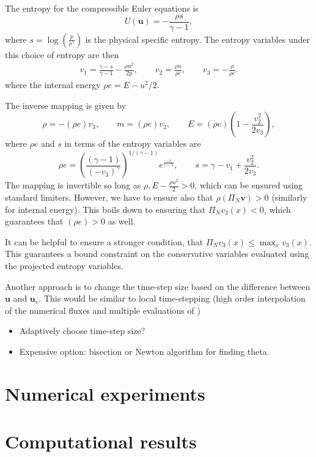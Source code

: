 \documentclass[preprint,10pt]{article}
\theoremstyle{definition}
\theoremstyle{lemma}
\theoremstyle{theorem}
\theoremstyle{assumption}
\newcommand{\LRp}[1]{\left( #1 \right)}
\begin{document}
{The entropy for the compressible Euler equations is 
\[
U(\bm{u}) = -\frac{\rho s}{\gamma-1},
\]
where $s = \log\LRp{\frac{p}{\rho^\gamma}}$ is the physical specific entropy.  The entropy variables under this choice of entropy are then
\begin{align*}
v_1 = \frac{\gamma-s}{\gamma-1} - \frac{\rho u^2}{2p}, \qquad v_2 = \frac{\rho u}{\rho e}, \qquad v_3 = -\frac{\rho}{\rho e}.
\end{align*}
where the internal energy $\rho e = E - u^2/2$.

The inverse mapping is given by 
\[
\rho = -(\rho e) v_3, \qquad m = (\rho e) v_2, \qquad E = (\rho e)\LRp{1 - \frac{v_2^2}{2 v_3}},
\]
where $\rho e$ and $s$ in terms of the entropy variables are 
\[
\rho e = \LRp{\frac{(\gamma-1)}{\LRp{-v_3}^{\gamma}}}^{1/(\gamma-1)}e^{\frac{-s}{\gamma-1}}, \qquad s = \gamma - v_1 + \frac{v_2^2}{2v_3}.
\]
The mapping is invertible so long as $\rho, E-\frac{\rho u^2}{2} > 0$, which can be ensured using standard limiters.  However, we have to ensure also that $\rho(\Pi_N\bm{v}) > 0$ (similarly for internal energy).  This boils down to ensuring that $\Pi_N v_3(x) < 0$, which guarantees that $(\rho e) > 0$ as well.   

It can be helpful to ensure a stronger condition, that $\Pi_N v_3(x) \leq \max_{x} v_3(x)$.  This guarantees a bound constraint on the conservative variables evaluated using the projected entropy variables.  

Another approach is to change the time-step size based on the difference between $\bm{u}$ and $\bm{u}_v$.  This would be similar to local time-stepping (high order interpolation of the numerical fluxes and multiple evaluations of )

\begin{itemize}
\item Adaptively choose time-step size?
\item Expensive option: bisection or Newton algorithm for finding theta.  
\end{itemize}

\section{Numerical experiments}


\section{Computational results}

}
\end{document}
